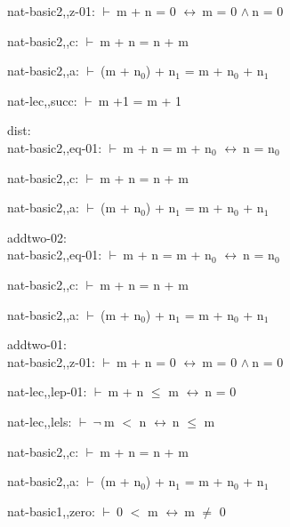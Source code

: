 \documentclass[a4paper]{article}
\newcommand{\Fol}{\mbox{$\vdash\ $}}
\newcommand{\Not}{\mbox{$\neg\ $}}
\newcommand{\And}{\mbox{$\wedge\ $}}
\newcommand{\Equiv}{\mbox{$\leftrightarrow\ $}}
\begin{document}
nat-basic2,,z-01: 
 \Fol m + n = 0 \Equiv m = 0 \And n = 0



nat-basic2,,c: 
 \Fol m + n = n + m



nat-basic2,,a: 
 \Fol (m + $\mbox{n}_{0}$) + $\mbox{n}_{1}$ = m + $\mbox{n}_{0}$ + $\mbox{n}_{1}$



nat-lec,,succ: 
 \Fol m +1 = m + 1



\bigskip

dist:\\ nat-basic2,,eq-01: 
 \Fol m + n = m + $\mbox{n}_{0}$ \Equiv n = $\mbox{n}_{0}$



nat-basic2,,c: 
 \Fol m + n = n + m



nat-basic2,,a: 
 \Fol (m + $\mbox{n}_{0}$) + $\mbox{n}_{1}$ = m + $\mbox{n}_{0}$ + $\mbox{n}_{1}$



\bigskip

addtwo-02:\\ nat-basic2,,eq-01: 
 \Fol m + n = m + $\mbox{n}_{0}$ \Equiv n = $\mbox{n}_{0}$



nat-basic2,,c: 
 \Fol m + n = n + m



nat-basic2,,a: 
 \Fol (m + $\mbox{n}_{0}$) + $\mbox{n}_{1}$ = m + $\mbox{n}_{0}$ + $\mbox{n}_{1}$



\bigskip

addtwo-01:\\ nat-basic2,,z-01: 
 \Fol m + n = 0 \Equiv m = 0 \And n = 0



nat-lec,,lep-01: 
 \Fol m + n $\le$ m \Equiv n = 0



nat-lec,,lels: 
 \Fol \Not m $<$ n \Equiv n $\le$ m



nat-basic2,,c: 
 \Fol m + n = n + m



nat-basic2,,a: 
 \Fol (m + $\mbox{n}_{0}$) + $\mbox{n}_{1}$ = m + $\mbox{n}_{0}$ + $\mbox{n}_{1}$



nat-basic1,,zero: 
 \Fol 0 $<$ m \Equiv m $\neq$ 0
\end{document}
